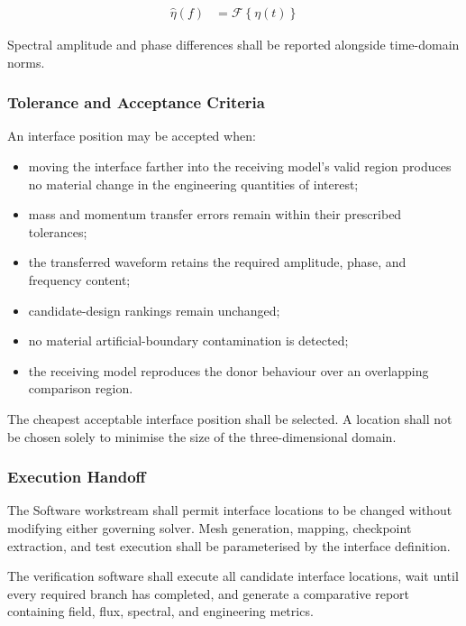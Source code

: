 \begin{align}
  \widehat{\eta}(f)
  &=
  \mathcal{F}
  \left\{
    \eta(t)
  \right\}
  \label{eq:res-ver-tst-interface-spectrum}
\end{align}

Spectral amplitude and phase differences shall be reported alongside
time-domain norms.

\subsubsection{Tolerance and Acceptance Criteria}
\label{sec:res-ver-tst-interface-location-acceptance}

An interface position may be accepted when:

\begin{itemize}
  \item moving the interface farther into the receiving model's valid
    region produces no material change in the engineering
    quantities of interest;
  \item mass and momentum transfer errors remain within their
    prescribed tolerances;
  \item the transferred waveform retains the required amplitude,
    phase, and frequency content;
  \item candidate-design rankings remain unchanged;
  \item no material artificial-boundary contamination is detected;
  \item the receiving model reproduces the donor behaviour over an
    overlapping comparison region.
\end{itemize}

The cheapest acceptable interface position shall be selected. A
location shall not be chosen solely to minimise the size of the
three-dimensional domain.

\subsubsection{Execution Handoff}
\label{sec:res-ver-tst-interface-location-handoff}

The Software workstream shall permit interface locations to be changed
without modifying either governing solver. Mesh generation, mapping,
checkpoint extraction, and test execution shall be parameterised by the
interface definition.

The verification software shall execute all candidate interface
locations, wait until every required branch has completed, and generate
a comparative report containing field, flux, spectral, and engineering
metrics.

